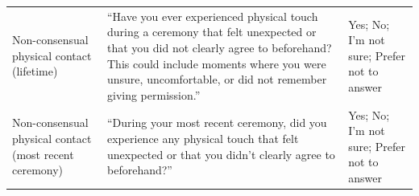 \documentclass[12pt]{article}
\begin{document}
\begin{table}[htbp]
\begin{tabular}{p{3cm}p{5.6cm}p{5.4cm}}
\addlinespace
Non-consensual physical contact \newline (lifetime) &
``Have you ever experienced physical touch during a ceremony that felt unexpected or that you did not
clearly agree to beforehand? This could include moments where you were unsure, uncomfortable, or did not
remember giving permission.'' &
Yes; No; I'm not sure; Prefer not to answer \\
\addlinespace
Non-consensual physical contact \newline (most recent ceremony) &
``During your most recent ceremony, did you experience any physical touch that felt unexpected or that you
didn't clearly agree to beforehand?'' &
Yes; No; I'm not sure; Prefer not to answer \\
\bottomrule
\end{tabular}
\end{table}
\end{document}
